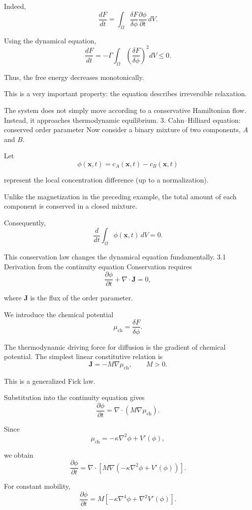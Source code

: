 Indeed,
\[
\frac{dF}{dt}
=
\int_\Omega
\frac{\delta F}{\delta\phi}
\frac{\partial\phi}{\partial t}\,dV.
\]

Using the dynamical equation,
\[
\boxed{
\frac{dF}{dt}
=
-\Gamma\int_\Omega
\left(\frac{\delta F}{\delta\phi}\right)^2dV
\leq0.
}
\]

Thus, the free energy decreases monotonically.

This is a very important property: the equation describes irreversible relaxation.

The system does not simply move according to a conservative Hamiltonian flow. Instead, it approaches thermodynamic equilibrium.
3. Cahn–Hilliard equation: conserved order parameter
Now consider a binary mixture of two components, \(A\) and \(B\).

Let
\[
\phi(\mathbf x,t)=c_A(\mathbf x,t)-c_B(\mathbf x,t)
\]

represent the local concentration difference (up to a normalization).

Unlike the magnetization in the preceding example, the total amount of each component is conserved in a closed mixture.

Consequently,
\[
\boxed{
\frac{d}{dt}\int_\Omega\phi(\mathbf x,t)\,dV=0.
}
\]

This conservation law changes the dynamical equation fundamentally.
3.1 Derivation from the continuity equation
Conservation requires
\[
\frac{\partial\phi}{\partial t}
+\nabla\cdot\mathbf J=0,
\]

where \(\mathbf J\) is the flux of the order parameter.

We introduce the chemical potential
\[
\mu_{\mathrm{ch}}
=
\frac{\delta F}{\delta\phi}.
\]

The thermodynamic driving force for diffusion is the gradient of chemical potential. The simplest linear constitutive relation is
\[
\boxed{
\mathbf J=-M\nabla\mu_{\mathrm{ch}},
\qquad M>0.
}
\]

This is a generalized Fick law.

Substitution into the continuity equation gives
\[
\frac{\partial\phi}{\partial t}
=
\nabla\cdot
\left(M\nabla\mu_{\mathrm{ch}}\right).
\]

Since
\[
\mu_{\mathrm{ch}}
=
-\kappa\nabla^2\phi+V'(\phi),
\]

we obtain
\[
\boxed{
\frac{\partial\phi}{\partial t}
=
\nabla\cdot
\left[
M\nabla\left(
-\kappa\nabla^2\phi+V'(\phi)
\right)
\right].
}
\]

For constant mobility,
\[
\boxed{
\frac{\partial\phi}{\partial t}
=
M\left[
-\kappa\nabla^4\phi+
\nabla^2V'(\phi)
\right].
}
\]

